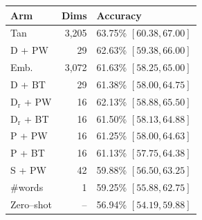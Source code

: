 \begin{tabular}{@{}l r l@{}}
\toprule
Arm & Dims & Accuracy \\
\midrule
    Tan & 3{,}205 & 63.75\% \scriptsize{$[60.38, 67.00]$} \\
    D + PW & 29 & 62.63\% \scriptsize{$[59.38, 66.00]$} \\
    Emb. & 3{,}072 & 61.63\% \scriptsize{$[58.25, 65.00]$} \\
    D + BT & 29 & 61.38\% \scriptsize{$[58.00, 64.75]$} \\
    D$_{\mathrm{r}}$ + PW & 16 & 62.13\% \scriptsize{$[58.88, 65.50]$} \\
    D$_{\mathrm{r}}$ + BT & 16 & 61.50\% \scriptsize{$[58.13, 64.88]$} \\
    P + PW & 16 & 61.25\% \scriptsize{$[58.00, 64.63]$} \\
    P + BT & 16 & 61.13\% \scriptsize{$[57.75, 64.38]$} \\
    S + PW & 42 & 59.88\% \scriptsize{$[56.50, 63.25]$} \\
    \#words & 1 & 59.25\% \scriptsize{$[55.88, 62.75]$} \\
    Zero--shot & -- & 56.94\% \scriptsize{$[54.19, 59.88]$} \\
\bottomrule
\end{tabular}
